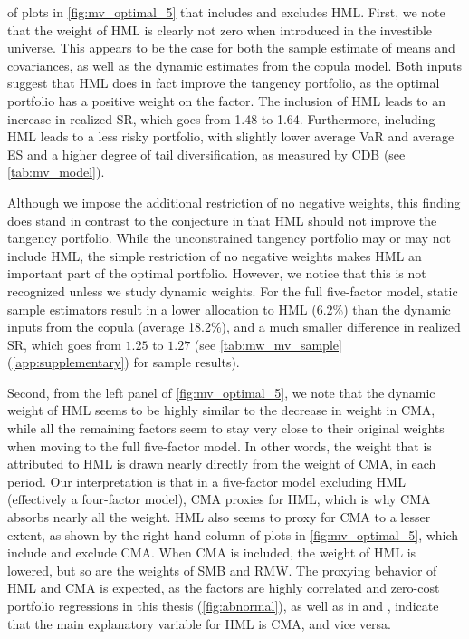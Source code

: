 of plots in \autoref{fig:mv_optimal_5} that includes and excludes HML. First, we note that the weight of HML is clearly not zero when introduced in the investible universe. This appears to be the case for both the sample estimate of means and covariances, as well as the dynamic estimates from the copula model. Both inputs suggest that HML does in fact improve the tangency portfolio, as the optimal portfolio has a positive weight on the factor. The inclusion of HML leads to an increase in realized SR, which goes from 1.48 to 1.64. Furthermore, including HML leads to a less risky portfolio, with slightly lower average VaR and average ES and a higher degree of tail diversification, as measured by CDB (see \autoref{tab:mv_model}).

Although we impose the additional restriction of no negative weights, this finding does stand in contrast to the conjecture in \textcite{FF2015} that HML should not improve the tangency portfolio. While the unconstrained tangency portfolio may or may not include HML, the simple restriction of no negative weights makes HML an important part of the optimal portfolio. However, we notice that this is not recognized unless we study dynamic weights. For the full five-factor model, static sample estimators result in a lower allocation to HML (6.2\%) than the dynamic inputs from the copula (average 18.2\%), and a much smaller difference in realized SR, which goes from $1.25$ to $1.27$ (see \autoref{tab:mw_mv_sample} (\autoref{app:supplementary}) for sample results).

Second, from the left panel of \autoref{fig:mv_optimal_5}, we note that the dynamic weight of HML seems to be highly similar to the decrease in weight in CMA, while all the remaining factors seem to stay very close to their original weights when moving to the full five-factor model. In other words, the weight that is attributed to HML is drawn nearly directly from the weight of CMA, in each period. Our interpretation is that in a five-factor model excluding HML (effectively a four-factor model), CMA proxies for HML, which is why CMA absorbs nearly all the weight. HML also seems to proxy for CMA to a lesser extent, as shown by the right hand column of plots in \autoref{fig:mv_optimal_5}, which include and exclude CMA. When CMA is included, the weight of HML is lowered, but so are the weights of SMB and RMW. The proxying behavior of HML and CMA is expected, as the factors are highly correlated and zero-cost portfolio regressions in this thesis (\autoref{fig:abnormal}), as well as in \textcite{FF2015} and \textcite{Asness2015}, indicate that the main explanatory variable for HML is CMA, and vice versa.


